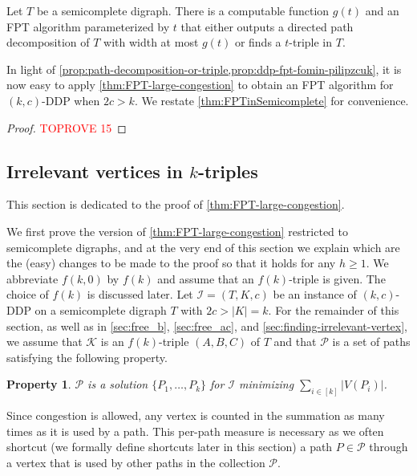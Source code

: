 \documentclass[a4paper,UKenglish,cleveref, autoref, thm-restate]{lipics-v2021}
\newtheorem{property}[theorem]{Property}
\renewcommand{\FPT}{{\sf FPT}\xspace}
\begin{document}
\begin{proposition}\label{prop:path-decomposition-or-triple}
Let $T$ be a semicomplete digraph.
There is a computable function $g(t)$ and an \FPT algorithm parameterized by $t$ that either outputs a directed path decomposition of $T$ with width at most $g(t)$ or finds a $t$-triple in $T$.
\end{proposition}

In light of \cref{prop:path-decomposition-or-triple,prop:ddp-fpt-fomin-pilipzcuk}, it is now easy to apply \autoref{thm:FPT-large-congestion} to obtain an \FPT algorithm for $(k,c)$-\textsc{DDP} when $2c > k$.
We restate \autoref{thm:FPTinSemicomplete} for convenience.

\FPTinSemicomplete* 

\begin{proof}\textcolor{red}{TOPROVE 15}\end{proof}

\subsection{Irrelevant vertices in
\texorpdfstring{$k$}{k}-triples}\label{sec:irrelevant-vertex-in-triples}
This section is dedicated to the proof of \autoref{thm:FPT-large-congestion}.

We first prove the version of \autoref{thm:FPT-large-congestion} restricted to semicomplete digraphs, and at the very end of this section we explain which are the (easy) changes to be made to the proof so that it holds for any $h \geq 1$. We abbreviate $f(k,0)$ by $f(k)$ and assume
that an $f(k)$-triple is given.
The choice of $f(k)$ is discussed later.
Let $\mathcal{I} = (T, K, c)$ be an instance of $(k,c)$-\textsc{DDP} on a
semicomplete digraph $T$ with $2c > |K| = k$.
For the remainder of this section, as well as in \autoref{sec:free_b}, \autoref{sec:free_ac}, and \autoref{sec:finding-irrelevant-vertex}, we assume that $\mathcal{K}$ is an
$f(k)$-triple $(A,B,C)$ of $T$ and that $\mathcal{P}$ is a set of paths satisfying the
following property.
\begin{property}
  \label{prop:minimizing-for-solution}
  $\mathcal{P}$ is a solution $\{P_1, \ldots, P_k\}$ for $\mathcal{I}$ minimizing
  $\sum_{i \in [k]}|V(P_i)|$.
\end{property}

Since congestion is allowed, any vertex is counted in the summation as many
times as it is used by a path.
This per-path measure is necessary as we often shortcut (we formally define shortcuts
later in this section) a path $P \in \mathcal{P}$ through a vertex that is used by other
paths in the collection
$\mathcal{P}$.
\end{document}

